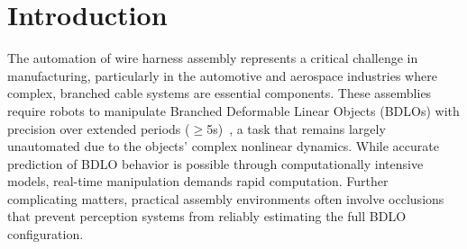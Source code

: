 \section{Introduction}
The automation of wire harness assembly represents a critical challenge in manufacturing, particularly in the automotive and aerospace industries where complex, branched cable systems are essential components. 
These assemblies require robots to manipulate Branched Deformable Linear Objects (BDLOs) with precision over extended periods ($\geq$5s)~\cite{deform_survey1, deform_survey2, saha2007manipulation}, a task that remains largely unautomated due to the objects' complex nonlinear dynamics. 
While accurate prediction of BDLO behavior is possible through computationally intensive models, real-time manipulation demands rapid computation. 
Further complicating matters, practical assembly environments often involve occlusions that prevent perception systems from reliably estimating the full BDLO configuration.

